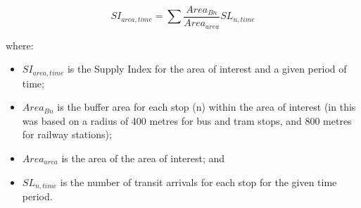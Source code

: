 \documentclass[preprint, 3p,
authoryear]{elsarticle} %
\begin{document}
\[SI_{area, time} = \sum{\frac{Area_{Bn}}{Area_{area}}SL_{n, time}}\]

where:

\begin{itemize}
\item
  \(SI_{area, time}\) is the Supply Index for the area of interest and a
  given period of time;
\item
  \(Area_{Bn}\) is the buffer area for each stop (n) within the area of
  interest (in \citet{currie2010identifying} this was based on a radius
  of 400 metres for bus and tram stops, and 800 metres for railway
  stations);
\item
  \(Area_{area}\) is the area of the area of interest; and
\item
  \(SL_{n,time}\) is the number of transit arrivals for each stop for
  the given time period.
\end{itemize}
\end{document}
